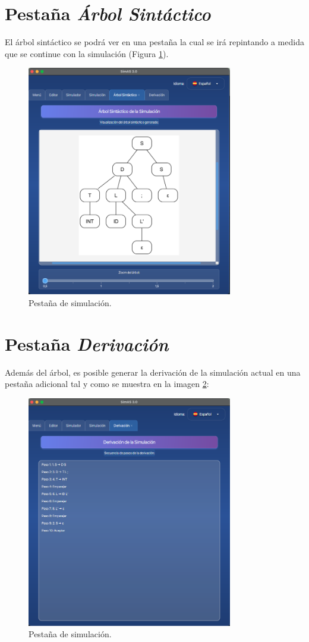 \section{Pestaña \textit{Árbol Sintáctico}}

El árbol sintáctico se podrá ver en una pestaña la cual se irá repintando a medida que se continue con la simulación (Figura \ref{fig:da22}).

\begin{figure}[htp]
\centering
	\includegraphics[width=0.8\textwidth]{figuras2/simulador/simulacion_arbol.png}
	\caption{Pestaña de simulación.}
	\label{fig:da22}
\end{figure}

\section{Pestaña \textit{Derivación}}

Además del árbol, es posible generar la derivación de la simulación actual en una pestaña adicional tal y como se muestra en la imagen \ref{fig:da24}:

\begin{figure}[htp]
\centering
	\includegraphics[width=0.8\textwidth]{figuras2/simulador/simulacion_derivacion.png}
	\caption{Pestaña de simulación.}
	\label{fig:da24}
\end{figure}